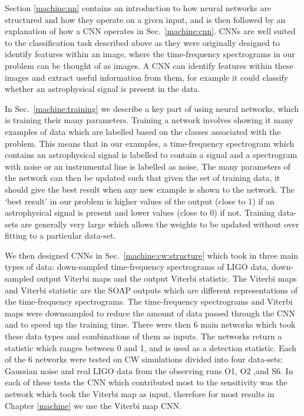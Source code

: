 Section \ref{machine:nn}  contains an introduction to how neural networks are
structured and how they operate on a given input, and is then followed by an
explanation of how a \gls{CNN} operates in Sec.~\ref{machine:cnn}.  \glspl{CNN}
are well suited to the classification task described above as they
were originally designed to identify features within an image, where
the time-frequency spectrograms in our problem can be thought of as images.  A
\gls{CNN} can identify features within these images and extract useful
information from them, for example it could classify whether an astrophysical
signal is present in the data.

In Sec.~\ref{machine:training} we describe a key part of using neural networks,
which is training their many parameters.  Training a network involves showing
it many examples of data which are labelled based on the classes associated
with the problem.  This means that in our examples, a time-frequency
spectrogram which contains an astrophysical signal is labelled to contain a
signal and a spectrogram with noise or an instrumental line is labelled as
noise.  The many parameters of the network can then be updated such that given
the set of training data, it should give the best result when any new example is shown to the network.
The `best result' in our problem is higher values of the output (close to 1) if an astrophysical signal is present and lower values (close to 0) if not.
Training data-sets are generally very large which allows the
weights to be updated without over fitting to a particular data-set. 

We then designed \glspl{CNN} in Sec.~\ref{machine:cw:structure} which took in
three main types of data: down-sampled time-frequency spectrograms of
\gls{LIGO} data, down-sampled output Viterbi maps and the output Viterbi
statistic.  The Viterbi maps and Viterbi statistic are the SOAP outputs which
are different representations of the time-frequency spectrograms.  The
time-frequency spectrograms and Viterbi maps were downsampled to reduce the
amount of data passed through the \gls{CNN} and to speed up the training time.
There were then 6 main networks which took these data types and combinations of
them as inputs.  The networks return a statistic which ranges between 0 and 1,
and is used as a detection statistic.  Each of the 6 networks were tested on
\gls{CW} simulations divided into four data-sets: Gaussian noise and
real \gls{LIGO} data from the observing runs O1, O2 ,and S6.  In each of these
tests the \gls{CNN} which contributed most to the sensitivity was the network
which took the Viterbi map as input, therefore for most results in Chapter
\ref{machine} we use the Viterbi map \gls{CNN}. 

